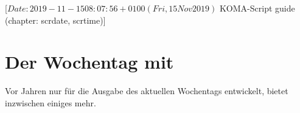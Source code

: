 %
%
%
%
%
%
%
%
% 
%
%
%
%

                 [$Date: 2019-11-15 08:07:56 +0100 (Fri, 15 Nov 2019) $
                  KOMA-Script guide (chapter: scrdate, scrtime)]

\chapter{Der Wochentag mit }
\BeginIndexGroup
{}

\iffalse%
Ursprünglich sollte das Paket \Package{scrdate} lediglich den Wochentag zum
aktuellen Datum liefern. Inzwischen bietet es dies und etwas mehr für jedes
beliebige Datum im Gregorianischen Kalender.%
\else%
Vor \the\numexpr{}\relax{} Jahren nur für die Ausgabe des aktuellen
Wochentags entwickelt, bietet  inzwischen einiges mehr.
\fi

